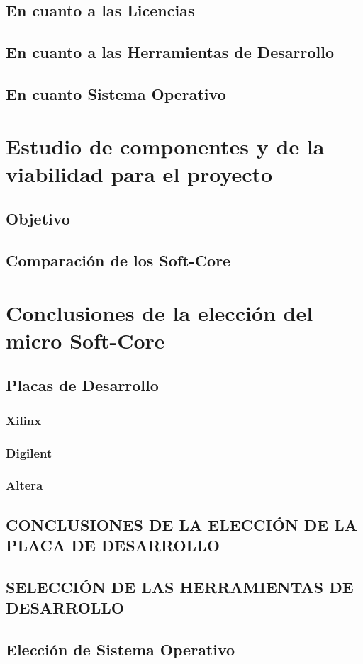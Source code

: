 	
			\subsection{En cuanto a las Licencias}
			\subsection{En cuanto a las Herramientas de Desarrollo}
			\subsection{En cuanto Sistema Operativo} 	 
	\section{Estudio de componentes y de la viabilidad para el proyecto}	
			\subsection{Objetivo} 	 
			\subsection{Comparación de los Soft-Core} 
	\section{Conclusiones de la elección del micro
	 	Soft-Core}
 			\subsection{Placas de Desarrollo}
				\subsubsection{Xilinx}
				\subsubsection{Digilent} 	 
				\subsubsection{Altera}
 			\subsection{CONCLUSIONES DE LA ELECCIÓN DE LA PLACA DE
 		DESARROLLO}
 			\subsection{SELECCIÓN DE LAS HERRAMIENTAS DE DESARROLLO} 	 
 			\subsection{Elección de Sistema Operativo}
 			